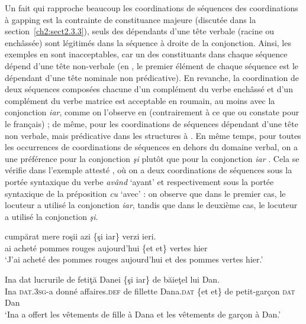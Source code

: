 Un fait qui rapproche beaucoup les coordinations de séquences des coordinations à gapping est la contrainte de constituance majeure (discutée dans la section~\ref{ch2:sect2.3.3}), {\cad} seuls des dépendants d’une tête verbale (racine ou enchâssée) sont légitimés dans la séquence à droite de la conjonction. Ainsi, les exemples en  sont inacceptables, car un des constituants dans chaque séquence dépend d’une tête non-verbale (en , le premier élément de chaque séquence est le dépendant d’une tête nominale non prédicative). En revanche, la coordination de deux séquences composées chacune d’un complément du verbe enchâssé et d’un complément du verbe matrice est acceptable en roumain, au moins avec la conjonction \textit{iar}, comme on l’observe en  (contrairement à ce que \citealt{Mouret2007} ou \citealt{Mouret2008} constate pour le français) ; de même, pour les coordinations de séquences dépendant d’une tête non verbale, mais prédicative dans les structures à  . En même temps, pour toutes les occurrences de coordinations de séquences en dehors du domaine verbal, on a une préférence pour la conjonction \textit{şi} plutôt que pour la conjonction \textit{iar} . Cela se vérifie dans l’exemple attesté , où on a deux coordinations de séquences sous la portée syntaxique du verbe \textit{având} ‘ayant’ et respectivement sous la portée syntaxique de la préposition \textit{cu} ‘avec’ : on observe que dans le premier cas, le locuteur a utilisé la conjonction \textit{iar}, tandis que dans le deuxième cas, le locuteur a utilisé la conjonction \textit{şi}.
\largerpage

\ea \label{ch2:ex310}
\ea 
\gll *  cumpărat  mere  roşii  azi  \{şi {\textbar} iar\}  verzi  ieri.\\
ai  acheté  pommes  rouges  aujourd’hui  \{et {\textbar} et\}  vertes  hier\\
\glt ‘J’ai acheté des pommes rouges aujourd’hui et des pommes vertes hier.’

\ex 
\gll *Ina    dat  lucrurile  de  fetiţă  Danei  \{şi {\textbar} iar\}  de  băieţel lui  Dan.\\
Ina  \textsc{dat.3sg}{}-a  donné  affaires.\textsc{def}  de  fillette  Dana.\textsc{dat}  \{et {\textbar} et\}  de  petit-garçon \textsc{dat}  Dan\\
\glt ‘Ina a offert les vêtements de fille à Dana et les vêtements de garçon à Dan.’


